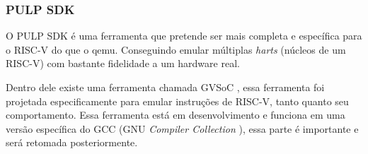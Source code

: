 \subsubsection{PULP SDK}

O PULP SDK \cite{PulpSDKRepositorio} é uma ferramenta que pretende ser mais completa e específica para o RISC-V do que o qemu. 
Conseguindo emular múltiplas \textit{harts} (núcleos de um RISC-V) com bastante fidelidade a um hardware real.

Dentro dele existe uma ferramenta chamada GVSoC \cite{9643828}, essa ferramenta foi projetada especificamente para emular 
instruções de RISC-V, tanto quanto seu comportamento. Essa ferramenta está em desenvolvimento e funciona em uma versão específica do 
GCC (GNU \textit{Compiler Collection} \cite{GCC}), essa parte é importante e será retomada posteriormente.
